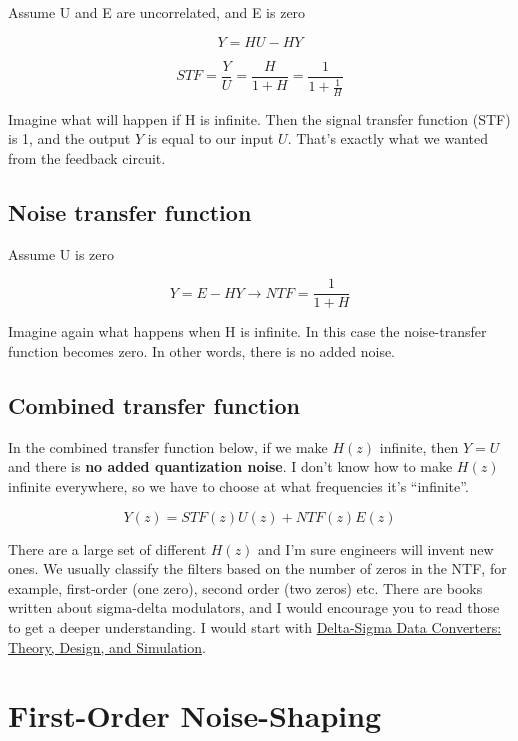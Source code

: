 Assume U and E are uncorrelated, and E is zero

\[Y = HU - HY \]

\[ STF = \frac{Y}{U} = \frac{H}{1 + H} = \frac{1}{1 + \frac{1}{H}}\]

Imagine what will happen if H is infinite. Then the signal transfer
function (STF) is 1, and the output \(Y\) is equal to our input \(U\).
That's exactly what we wanted from the feedback circuit.

\subsection{Noise transfer function}\label{noise-transfer-function}

Assume U is zero

\[ Y = E - HY \rightarrow NTF = \frac{1}{1 + H}\]

Imagine again what happens when H is infinite. In this case the
noise-transfer function becomes zero. In other words, there is no added
noise.

\subsection{Combined transfer
function}\label{combined-transfer-function}

In the combined transfer function below, if we make \(H(z)\) infinite,
then \(Y = U\) and there is \textbf{no added quantization noise}. I
don't know how to make \(H(z)\) infinite everywhere, so we have to
choose at what frequencies it's ``infinite''.

\[Y(z) = STF(z) U(z) + NTF(z) E(z)\]

There are a large set of different \(H(z)\) and I'm sure engineers will
invent new ones. We usually classify the filters based on the number of
zeros in the NTF, for example, first-order (one zero), second order (two
zeros) etc. There are books written about sigma-delta modulators, and I
would encourage you to read those to get a deeper understanding. I would
start with \href{https://ieeexplore.ieee.org/book/5273726}{Delta-Sigma
Data Converters: Theory, Design, and Simulation}.

\section{First-Order Noise-Shaping}\label{first-order-noise-shaping}

